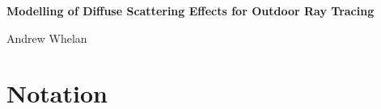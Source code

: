 \documentclass{article}
\numberwithin{equation}{section}
\begin{document}
    \begin{titlepage}
        \centering
        \vspace*{\fill}  %

        {\Huge\bfseries Modelling of Diffuse Scattering Effects for Outdoor Ray Tracing \par}
        \vspace{1cm}
        
        {\Large Andrew Whelan \par}
        \vspace{0.5cm}
        
        {\large \date{\today} \par}

        \vspace*{\fill}  %
    \end{titlepage}

    \thispagestyle{empty}
    \setcounter{page}{0}
    \tableofcontents

    \newpage
    \small
    \section*{Notation}
\end{document}
